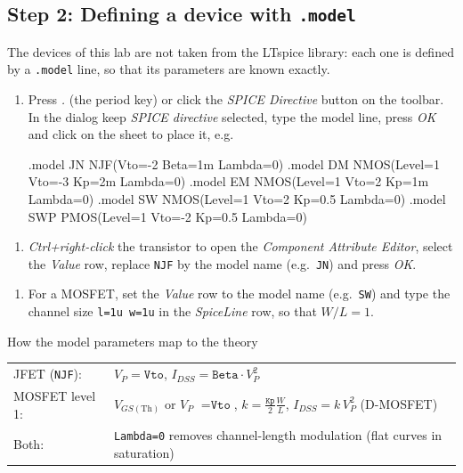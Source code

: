 \subsection{Step 2: Defining a device with \texttt{.model}}
The devices of this lab are not taken from the LTspice library: each one is defined by a \texttt{.model} line, so that its
parameters are known exactly.
\begin{enumerate}[itemsep=2pt]
  \item Press \textit{.} (the period key) or click the \textit{SPICE Directive} button on the toolbar. In the dialog keep \textit{SPICE directive} selected, type the model line, press \textit{OK} and click on the sheet to place it, e.g.
\begin{spice}[title=Models used in Lab 5]
.model JN  NJF(Vto=-2 Beta=1m Lambda=0)
.model DM  NMOS(Level=1 Vto=-3 Kp=2m Lambda=0)
.model EM  NMOS(Level=1 Vto=2  Kp=1m Lambda=0)
.model SW  NMOS(Level=1 Vto=2  Kp=0.5 Lambda=0)
.model SWP PMOS(Level=1 Vto=-2 Kp=0.5 Lambda=0)
\end{spice}
\end{enumerate}
\begin{enumerate}[resume,itemsep=2pt]
  \item \textit{Ctrl+right-click} the transistor to open the \textit{Component Attribute Editor}, select the \textit{Value} row,
        replace \texttt{NJF} by the model name (e.g.\ \texttt{JN}) and press \textit{OK}.
\end{enumerate}
\begin{enumerate}[resume,itemsep=2pt]
  \item For a MOSFET, set the \textit{Value} row to the model name (e.g.\ \texttt{SW}) and type the channel size
        \texttt{l=1u w=1u} in the \textit{SpiceLine} row, so that $W/L = 1$.
\end{enumerate}
\begin{notebox}{How the model parameters map to the theory}
\begin{tabular}{l l}
JFET (\texttt{NJF}): & $V_P = \texttt{Vto}$, \quad $I_{DSS} = \texttt{Beta}\cdot V_P^2$\\
MOSFET level 1: & $V_{GS(\mathrm{Th})}$ or $V_P$ $= \texttt{Vto}$, \quad $k = \tfrac{\texttt{Kp}}{2}\tfrac{W}{L}$, \quad $I_{DSS} = k\,V_P^2$ (D-MOSFET)\\
Both: & \texttt{Lambda=0} removes channel-length modulation (flat curves in saturation)
\end{tabular}
\end{notebox}

